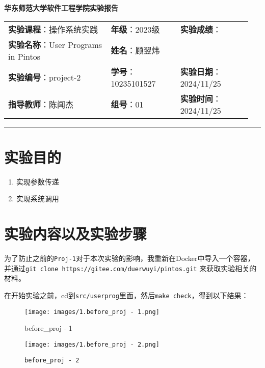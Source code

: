 \documentclass{article}
\begin{document}
	\begin{center}
		{\Large{\textbf{\heiti 华东师范大学软件工程学院实验报告}}}
		\begin{table}[htb]
			\flushleft
			\begin{tabular}{p{0.4\linewidth}p{0.27\linewidth}p{0.28\linewidth}}\\
				\textbf{实验课程}：操作系统实践  & \textbf{年级}：2023级       & \textbf{实验成绩}：  \\
				\textbf{实验名称}：User Programs in Pintos & \textbf{姓名}：顾翌炜         &                 \\
				\textbf{实验编号}：project-2     & \textbf{学号}：10235101527 & \textbf{实验日期}：2024/11/25  \\
				\textbf{指导教师}：陈闻杰     & \textbf{组号}：01            & \textbf{实验时间}：2024/11/25  \\ 
			\end{tabular}
		\end{table}
	\end{center}
	\rule{\textwidth}{2pt}
	
	
	\section{实验目的}
	
	\begin{enumerate}[noitemsep, label={{\arabic*})}]
		\item 实现参数传递
		\item 实现系统调用
	\end{enumerate}
	
	\section{实验内容以及实验步骤}
	
	为了防止之前的\texttt{Proj-1}对于本次实验的影响，我重新在Docker中导入一个容器，并通过\texttt{git clone https://gitee.com/duerwuyi/pintos.git} 来获取实验相关的材料。
	
	在开始实验之前，cd到\texttt{src/userprog}里面，然后\texttt{make check}，得到以下结果：
	
	\begin{figure}[H]
		\centering
		\begin{minipage}[b]{0.45\textwidth}
			\texttt{[image: images/1.before\_proj - 1.png]}
			\caption{before\_proj - 1}
		\end{minipage}
		\hfill
		\begin{minipage}[b]{0.45\textwidth}
			\texttt{[image: images/1.before\_proj - 2.png]}
			\caption{\texttt{before\_proj - 2}}
		\end{minipage}
	\end{figure}
	
\end{document}

